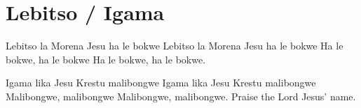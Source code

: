 \starttocol
\chapter{Lebitso / Igama}
\nexttocol
\hfill{\it }
\stoptocol
\starttocol
\startlines
L{\sc ebitso} la Morena Jesu ha le bokwe
Lebitso la Morena Jesu ha le bokwe 
Ha le bokwe, ha le bokwe 
Ha le bokwe, ha le bokwe.    

Igama lika Jesu Krestu malibongwe     
Igama lika Jesu Krestu malibongwe 
Malibongwe, malibongwe
Malibongwe, malibongwe.
\stoplines
\nexttocol
Praise the Lord Jesus' name.
\stoptocol

